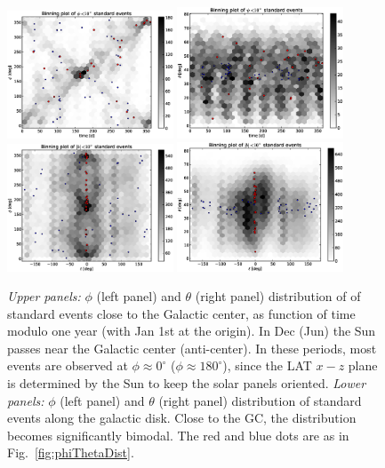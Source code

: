 \documentclass[aps,twocolumn,prd,superscriptaddress,showpacs,nofootinbib,fixfloat]{revtex4}
\begin{document}
\begin{figure}
  \centering
  \includegraphics[width=0.44\textwidth]{plots/TIME_PHI.eps}
  \includegraphics[width=0.44\textwidth]{plots/TIME_THETA.eps}
  \includegraphics[width=0.44\textwidth]{plots/L_PHI.eps}
  \includegraphics[width=0.44\textwidth]{plots/L_THETA.eps}
  \caption{\emph{Upper panels:} $\phi$ (left panel) and
  $\theta$ (right panel) distribution of of standard events
  close to the Galactic center, as function of time modulo
  one year (with Jan 1st at the origin). In Dec (Jun) the
  Sun passes near the Galactic center (anti-center).  In
  these periods, most events are observed at $\phi\approx
  0^\circ$ ($\phi\approx 180^\circ$), since the LAT $x-z$
  plane is determined by the Sun to keep the solar panels
  oriented. \emph{Lower panels:} $\phi$ (left panel) and
  $\theta$ (right panel) distribution of standard events
  along the galactic disk. Close to the GC, the distribution
  becomes significantly bimodal. The red and blue dots are
  as in Fig.~\ref{fig:phiThetaDist}.}
  \label{fig:time_phi}
\end{figure}
\end{document}
